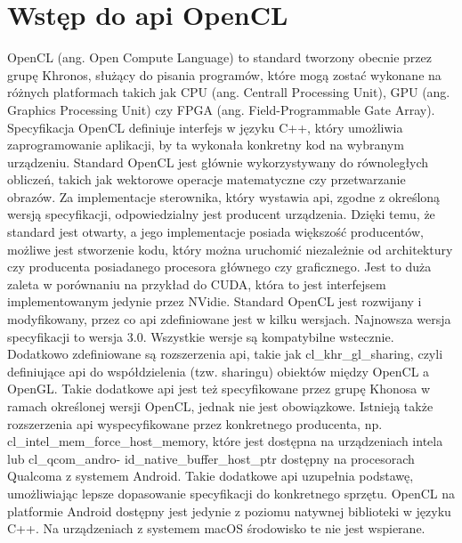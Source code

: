 \section[Wstęp do api OpenCL]{Wstęp do api OpenCL}
OpenCL (ang. Open Compute Language) to standard tworzony obecnie przez grupę Khronos, służący do pisania programów, które mogą zostać wykonane na różnych platformach takich jak CPU (ang. Centrall Processing Unit), GPU (ang. Graphics Processing Unit) czy FPGA (ang. Field-Programmable Gate Array). Specyfikacja OpenCL definiuje interfejs w języku C++, który umożliwia zaprogramowanie aplikacji, by ta wykonała konkretny kod na wybranym urządzeniu. Standard OpenCL jest głównie wykorzystywany do równoległych obliczeń, takich jak wektorowe operacje matematyczne czy przetwarzanie obrazów. Za implementacje sterownika, który wystawia api, zgodne z określoną wersją specyfikacji, odpowiedzialny jest producent urządzenia.  Dzięki temu, że standard jest otwarty, a jego implementacje posiada większość producentów, możliwe jest stworzenie kodu, który można uruchomić niezależnie od architektury czy producenta posiadanego procesora głównego czy graficznego. Jest to duża zaleta w porównaniu na przykład do CUDA, która to jest interfejsem implementowanym jedynie przez NVidie. Standard OpenCL jest rozwijany i modyfikowany, przez co api zdefiniowane jest w kilku wersjach. Najnowsza wersja specyfikacji to wersja 3.0. Wszystkie wersje są kompatybilne wstecznie. Dodatkowo zdefiniowane są rozszerzenia api, takie jak cl\_khr\_gl\_sharing, czyli definiujące api do współdzielenia (tzw. sharingu) obiektów między OpenCL a OpenGL. Takie dodatkowe api jest też specyfikowane przez grupę Khonosa w ramach określonej wersji OpenCL, jednak nie jest obowiązkowe. Istnieją także rozszerzenia api wyspecyfikowane przez konkretnego producenta, np. cl\_intel\_mem\_force\_host\_memory, które jest dostępna na urządzeniach intela lub cl\_qcom\_andro- id\_native\_buffer\_host\_ptr dostępny na procesorach Qualcoma z systemem Android. Takie dodatkowe api uzupełnia podstawę, umożliwiając lepsze dopasowanie specyfikacji do konkretnego sprzętu. OpenCL na platformie Android dostępny jest jedynie z poziomu natywnej biblioteki w języku C++. Na urządzeniach z systemem macOS środowisko te nie jest wspierane.

